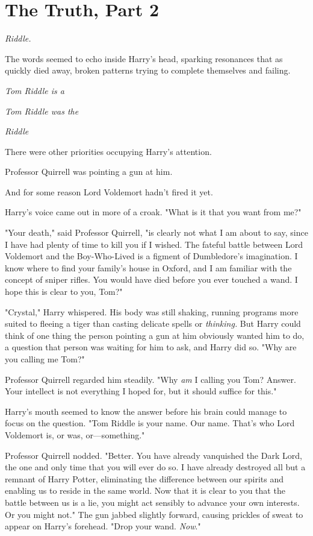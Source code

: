 \chapter{The Truth, Part 2}

 \emph{Riddle.}

The words seemed to echo inside Harry's head, sparking resonances that as
quickly died away, broken patterns trying to complete themselves and failing.

\emph{Tom Riddle is a}

\emph{Tom Riddle was the}

\emph{Riddle}

There were other priorities occupying Harry's attention.

Professor Quirrell was pointing a gun at him.

And for some reason Lord Voldemort hadn't fired it yet.

Harry's voice came out in more of a croak. "What is it that you want from me?"

"Your death," said Professor Quirrell, "is clearly not what I am about to say,
since I have had plenty of time to kill you if I wished. The fateful battle
between Lord Voldemort and the Boy-Who-Lived is a figment of Dumbledore's
imagination. I know where to find your family's house in Oxford, and I am
familiar with the concept of sniper rifles. You would have died before you ever
touched a wand. I hope this is clear to you, Tom?"

"Crystal," Harry whispered. His body was still shaking, running programs more
suited to fleeing a tiger than casting delicate spells or \emph{thinking.} But
Harry could think of one thing the person pointing a gun at him obviously
wanted him to do, a question that person was waiting for him to ask, and Harry
did so. "Why are you calling me Tom?"

Professor Quirrell regarded him steadily. "Why \emph{am} I calling you Tom?
Answer. Your intellect is not everything I hoped for, but it should suffice for
this."

Harry's mouth seemed to know the answer before his brain could manage to focus
on the question. "Tom Riddle is your name. Our name. That's who Lord Voldemort
is, or was, or—something."

Professor Quirrell nodded. "Better. You have already vanquished the Dark Lord,
the one and only time that you will ever do so. I have already destroyed all
but a remnant of Harry Potter, eliminating the difference between our spirits
and enabling us to reside in the same world. Now that it is clear to you that
the battle between us is a lie, you might act sensibly to advance your own
interests. Or you might not." The gun jabbed slightly forward, causing prickles
of sweat to appear on Harry's forehead. "Drop your wand. \emph{Now}."

